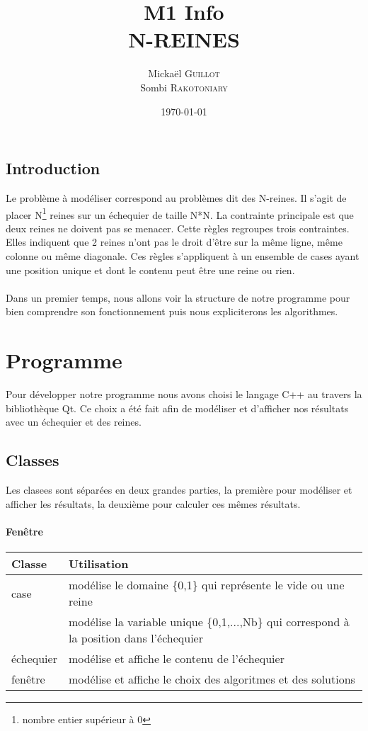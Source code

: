 \documentclass[a4paper,12pt]{report}
\title{M1 Info  \\ \normalsize N-REINES}
\author{Mickaël \textsc{Guillot} \\ Sombi \textsc{Rakotoniary} }
\date{\today}
\begin{document}
	\renewcommand{\headrulewidth}{0.001pt}

	
	\pagestyle{fancy}



	\maketitle

	\tableofcontents
\newpage
\section*{Introduction}
Le problème à modéliser correspond au problèmes dit des N-reines. Il s'agit de placer N\footnote{nombre entier supérieur à 0} reines sur un échequier de taille N*N. La contrainte principale est que deux reines ne doivent pas se menacer. Cette règles regroupes trois contraintes. Elles indiquent que 2 reines n'ont pas le droit d'être sur la même ligne, même colonne ou même diagonale. Ces règles s'appliquent à un ensemble de cases ayant une position unique et dont le contenu peut être une reine ou rien.
\\\\Dans un premier temps,  nous allons voir la structure de notre programme pour bien comprendre son fonctionnement puis nous expliciterons les algorithmes.


\newpage

\chapter{Programme}
Pour développer notre programme nous avons choisi le langage C++ au travers la bibliothèque Qt. Ce choix a été fait afin de modéliser et d'afficher nos résultats avec un échequier et des reines.
	\section{Classes}
	Les clasees sont séparées en deux grandes parties, la première pour modéliser et afficher les résultats, la deuxième pour calculer ces mêmes résultats. 
		\subsubsection{Fenêtre}
			\begin{tabular}{|l|l|}
				\hline
				Classe & Utilisation \\
				\hline
				case & modélise le domaine \{0,1\} qui représente le vide ou une reine\\
				& modélise la variable unique \{0,1,...,Nb\} qui correspond à la position dans l'échequier
				\\
				échequier & modélise et affiche le contenu de l'échequier\\
				fenêtre & modélise et affiche le choix des algoritmes et des solutions \\
				\hline
				
			\end{tabular}
\end{document}
